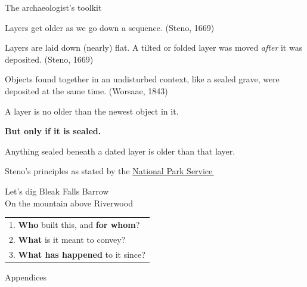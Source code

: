 \documentclass[aspectratio=169,11pt]{beamer}
\newcommand{\linkarrow}{\raisebox{0.15ex}{\scalebox{0.75}{$\nearrow$}}}
\begin{document}
\begin{frame}{The archaeologist's toolkit}
  \begin{description}
    \item[Superposition] Layers get older as we go down a sequence.
            {\small\color{stone}(Steno, 1669)}
    \item[Original horizontality] Layers are laid down (nearly) flat. A tilted or folded layer was moved \emph{after} it was deposited.
            {\small\color{stone}(Steno, 1669)}
    \item[Association] Objects found together in an undisturbed context, like a sealed grave, were deposited at the same time.
            {\small\color{stone}(Worsaae, 1843)}
    \item[Terminus post quem] A layer is no older than the newest object in it.
    \item[]     \textbf{\small         \alert{But only if it is sealed}.}
    \item[Terminus ante quem] Anything sealed beneath a dated layer is older than that layer.
  \end{description}
  \vfill
  {\tiny\color{stone}Steno's principles as stated by the
    \href{https://www.nps.gov/articles/geologic-principles-superposition-and-original-horizontality.htm}{National Park Service\,\linkarrow}}
\end{frame}

\begin{frame}{Let's dig}
  \centering
  \Huge Bleak Falls Barrow\\[0.6em]
  \normalsize\color{stone}On the mountain above Riverwood\\[2em]
  \color{black}
  \begin{tabular}{l}
    1. \textbf{Who} built this, and \textbf{for whom}? \\[0.3em]
    2. \textbf{What} is it meant to convey?            \\[0.3em]
    3. \textbf{What has happened} to it since?
  \end{tabular}
\end{frame}

\begin{frame}{Appendices}
  \centering
\end{frame}


\appendix
{}
\end{document}
